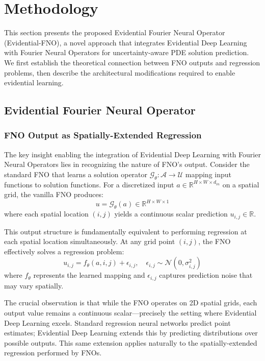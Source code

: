 \section{Methodology}

This section presents the proposed Evidential Fourier Neural Operator (Evidential-FNO), a novel approach that
integrates Evidential Deep Learning with Fourier Neural Operators for uncertainty-aware PDE solution prediction.
We first establish the theoretical connection between FNO outputs and regression problems, then describe the
architectural modifications required to enable evidential learning.

\subsection{Evidential Fourier Neural Operator}

\subsubsection{FNO Output as Spatially-Extended Regression}

The key insight enabling the integration of Evidential Deep Learning with Fourier Neural Operators lies in
recognizing the nature of FNO's output. Consider the standard FNO \cite{li2020fourier} that learns a solution
operator $\mathcal{G}_\theta: \mathcal{A} \rightarrow \mathcal{U}$ mapping input functions to solution functions. For a 
discretized input $a \in \mathbb{R}^{H \times W \times d_{in}}$ on a spatial grid, the vanilla FNO produces:
\begin{equation}
    u = \mathcal{G}_\theta(a) \in \mathbb{R}^{H \times W \times 1}
\end{equation}
where each spatial location $(i, j)$ yields a continuous scalar prediction $u_{i,j} \in \mathbb{R}$.

This output structure is fundamentally equivalent to performing regression at each spatial location simultaneously. 
At any grid point $(i, j)$, the FNO effectively solves a regression problem:
\begin{equation}
    u_{i,j} = f_\theta(a, i, j) + \epsilon_{i,j}, \quad \epsilon_{i,j} \sim \mathcal{N}(0, \sigma^2_{i,j})
\end{equation}
where $f_\theta$ represents the learned mapping and $\epsilon_{i,j}$ captures prediction noise that may vary 
spatially.

The crucial observation is that while the FNO operates on 2D spatial grids, each output value remains a 
continuous scalar---precisely the setting where Evidential Deep Learning excels. Standard regression
neural networks predict point estimates; Evidential Deep Learning \cite{amini2020deep} extends this by predicting
distributions over possible outputs. This same extension applies naturally to the spatially-extended regression
performed by FNOs.

